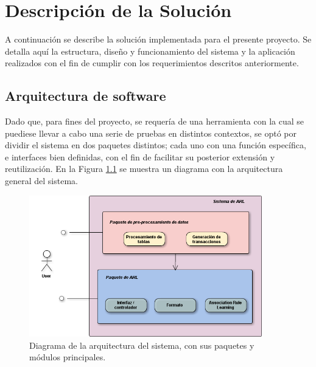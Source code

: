 \chapter{Descripción de la Solución}


A continuación se describe la solución implementada para el presente proyecto. Se detalla aquí la estructura, diseño y funcionamiento del sistema y la aplicación realizados con el fin de cumplir con los requerimientos descritos anteriormente.

\section{Arquitectura de software}

Dado que, para fines del proyecto, se requería de una herramienta con la cual se puediese llevar a cabo una serie de pruebas en distintos contextos, se optó por dividir el sistema en dos paquetes distintos; cada uno con una función específica, e interfaces bien definidas, con el fin de facilitar su posterior extensión y reutilización. En la Figura \ref{fig:arq_sistema} se muestra un diagrama con la arquitectura general del sistema.

\begin{figure}[h!]
\begin{center}
\includegraphics[width=0.9\textwidth]{imagenes/arq_sistema.png}
\end{center}
\vspace*{-5mm}
\caption{Diagrama de la arquitectura del sistema, con sus paquetes y módulos principales.}
\label{fig:arq_sistema}
\end{figure}

